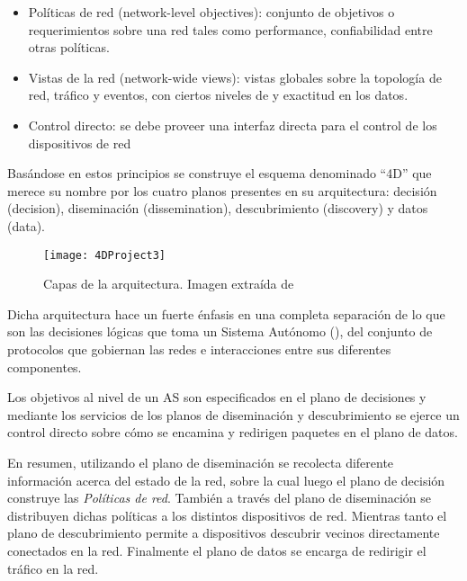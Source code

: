 \begin{itemize}
\item Políticas de red (network-level objectives): conjunto de objetivos o requerimientos sobre una red tales como performance, confiabilidad entre otras políticas.

\item Vistas de la red (network-wide views): vistas globales sobre la topolog\'ia de red, tr\'afico y eventos, con ciertos niveles de  y exactitud en los datos.

\item Control directo: se debe proveer una interfaz directa para el control de los dispositivos de red
\end{itemize}

Basándose en estos principios se construye el esquema denominado ``4D'' que merece su nombre por los cuatro planos presentes en su arquitectura: decisión (decision), diseminación (dissemination), descubrimiento (discovery) y datos (data).

\begin{figure}[h!] 
\centering    
\texttt{[image: 4DProject3]}
\caption[Capas de la arquitectura]{Capas de la arquitectura. Imagen extraída de \cite{greenberg2005clean}}
\label{fig:4DProject}
\end{figure}

Dicha arquitectura hace un fuerte énfasis en una completa separación de lo que son las decisiones lógicas que toma un Sistema Autónomo (), del conjunto de protocolos que gobiernan las redes e interacciones entre sus diferentes componentes.

Los objetivos al nivel de un AS son especificados en el plano de decisiones y mediante los servicios de los planos de diseminación y descubrimiento se ejerce un control directo sobre c\'omo se encamina y redirigen paquetes en el plano de datos.


En resumen, utilizando el plano de diseminación se recolecta diferente información acerca del estado de la red, sobre la cual luego el plano de decisión construye las \textit{Políticas de red}. También a través del plano de diseminación se distribuyen dichas políticas a los distintos dispositivos de red. Mientras tanto el plano de descubrimiento permite a dispositivos descubrir vecinos directamente conectados en la red. Finalmente el plano de datos se encarga de redirigir el tráfico en la red. \\

